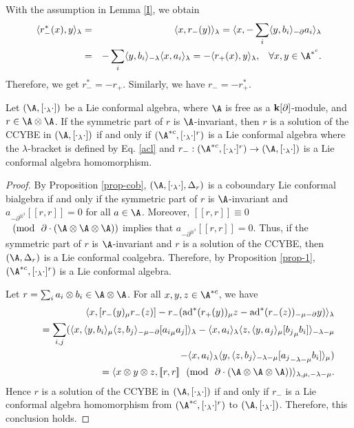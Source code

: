 \documentclass[12pt]{amsart}
\begin{document}
\begin{remark}\label{rmk-d}
With the assumption in Lemma \ref{I}, we obtain
\begin{eqnarray*}
    \langle r_-^\ast(x),y\rangle_\lambda&=&\langle x, r_-(y)\rangle_\lambda=\langle x, -\sum_i\langle y,b_i\rangle_{-\partial} a_i\rangle_\lambda\\
    &=&-\sum_i\langle y,b_i\rangle_{-\lambda} \langle x, a_i\rangle_\lambda=-\langle r_+(x),y\rangle_\lambda,\;\;\;\forall x, y\in \A^{\ast^c}.
\end{eqnarray*}
Therefore, we get $r_-^\ast=-r_+$. Similarly, we have $r_-=-r_+^\ast$.
 \end{remark}
\begin{theorem}\label{qtl}
Let $(\A,[\cdot_\lambda\cdot])$ be a  Lie conformal algebra, where
$\A$ is free as a ${\bf k}[\partial]$-module, and $r\in \A\otimes
\A$. If the symmetric part of  $r$ is $\A$-invariant, then $r$ is
a solution of the CCYBE in $(\A,[\cdot_\lambda\cdot])$ if and only
if $(\A^{*c},[\cdot_\lambda\cdot]^r)$ is a Lie conformal algebra
where the $\lambda$-bracket is defined by Eq. \eqref{acl} and
$r_-: (\A^{*c},[\cdot_\lambda\cdot]^r) \rightarrow
(\A,[\cdot_\lambda\cdot])$  is a Lie conformal algebra
homomorphism.
\end{theorem}
\begin{proof}
By Proposition \ref{prop-cob}, $(\A, [\cdot_\lambda \cdot], \Delta_r)$ is a coboundary Lie conformal bialgebra if and only if the symmetric part of $r$ is $\A$-invariant and $a_{-\partial^{\otimes^3}}[\![r,r]\!]=0$ for all $a\in \A$. Moreover, $[\![r,r]\!]\equiv 0$ $~~(\text{mod} ~~\partial \cdot (\A\otimes \A \otimes \A))$ implies that $ a_{ -\partial^{\otimes^3}}[\![r,r]\!]=0$.  Thus, if the symmetric part of  $r$ is $\A$-invariant and $r$ is a solution of the CCYBE, then $(\A, \Delta_r)$ is a Lie conformal coalgebra. Therefore, by Proposition \ref{prop-1}, $(\A^{*c},[\cdot_\lambda\cdot]^r)$ is a Lie conformal algebra.

Let $r=\sum_i a_i\otimes b_i\in \A\otimes \A$. For all $x,y,z\in \A^{*c}$, we have
\begin{eqnarray*}
    && \langle x,[r_-(y)_\mu r_-(z)]-r_-({\rm ad}^*(r_+(y))_\mu z-{\rm ad}^*(r_-(z))_{-\mu-\partial}y)\rangle_\lambda\\
    &&\quad=\sum_{i,j}(\langle x,\langle y,b_i\rangle_\mu\langle z,b_j\rangle_{-\mu-\partial}[{a_i}_\mu a_j] \rangle_\lambda    -\langle x,a_i\rangle_\lambda\langle z,\langle y,a_j\rangle_\mu[{b_j}_\mu b_i]\rangle_{-\lambda-\mu}\\
    &&\quad\quad-\langle x,a_i\rangle_\lambda\langle y,\langle z,b_j\rangle_{-\lambda-\mu}[{a_j}_{-\lambda-\mu}b_i]\rangle_\mu  ) \\
    &&\quad=\langle x\otimes y\otimes z,[\![r,r]\!] ~~(\text{mod} ~~\partial \cdot (\A\otimes \A \otimes
    \A))\rangle_{\lambda,\mu,-\lambda-\mu}.
\end{eqnarray*}
Hence $r$ is a solution of the CCYBE in $(\A, [\cdot_\lambda
\cdot])$ if and only if $r_-$ is a Lie conformal algebra
homomorphism from $(\A^{*c}, [\cdot_\lambda \cdot]^r)$ to $(\A,
[\cdot_\lambda \cdot])$. Therefore, this
conclusion holds. %
\end{proof}
\end{document}
